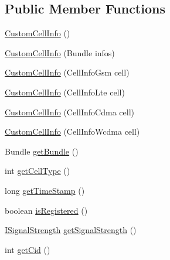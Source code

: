 \subsection*{Public Member Functions}
\begin{DoxyCompactItemize}
\item 
\hyperlink{classcom_1_1qualoutdoor_1_1recorder_1_1telephony_1_1CustomCellInfo_a0fa8dfdd8d509a0361c1286ea28907f6}{Custom\-Cell\-Info} ()
\item 
\hyperlink{classcom_1_1qualoutdoor_1_1recorder_1_1telephony_1_1CustomCellInfo_a43aa08090aedc7865df681a21146ac18}{Custom\-Cell\-Info} (Bundle infos)
\item 
\hyperlink{classcom_1_1qualoutdoor_1_1recorder_1_1telephony_1_1CustomCellInfo_a3603b4b5704ea4e03bc2d46071c57524}{Custom\-Cell\-Info} (Cell\-Info\-Gsm cell)
\item 
\hyperlink{classcom_1_1qualoutdoor_1_1recorder_1_1telephony_1_1CustomCellInfo_a5e4b002d86a4d579db2710555b57e833}{Custom\-Cell\-Info} (Cell\-Info\-Lte cell)
\item 
\hyperlink{classcom_1_1qualoutdoor_1_1recorder_1_1telephony_1_1CustomCellInfo_a7b6465c642331745f7b6e2706fd365fc}{Custom\-Cell\-Info} (Cell\-Info\-Cdma cell)
\item 
\hyperlink{classcom_1_1qualoutdoor_1_1recorder_1_1telephony_1_1CustomCellInfo_a97a065cf9b9a2c9886c4db7e79a61469}{Custom\-Cell\-Info} (Cell\-Info\-Wcdma cell)
\item 
Bundle \hyperlink{classcom_1_1qualoutdoor_1_1recorder_1_1telephony_1_1CustomCellInfo_a8c9db0839b7c4b08e37fc6e619660411}{get\-Bundle} ()
\item 
int \hyperlink{classcom_1_1qualoutdoor_1_1recorder_1_1telephony_1_1CustomCellInfo_a1d11b3897313e6f2f3a68820886752c0}{get\-Cell\-Type} ()
\item 
long \hyperlink{classcom_1_1qualoutdoor_1_1recorder_1_1telephony_1_1CustomCellInfo_aa1994d24bdd20e56e587aa7e2ac8f970}{get\-Time\-Stamp} ()
\item 
boolean \hyperlink{classcom_1_1qualoutdoor_1_1recorder_1_1telephony_1_1CustomCellInfo_aad17258b7352df3ce4e7d3bce90279ca}{is\-Registered} ()
\item 
\hyperlink{interfacecom_1_1qualoutdoor_1_1recorder_1_1telephony_1_1ISignalStrength}{I\-Signal\-Strength} \hyperlink{classcom_1_1qualoutdoor_1_1recorder_1_1telephony_1_1CustomCellInfo_a4d1f51ec74597facb936f02d07f05a38}{get\-Signal\-Strength} ()
\item 
int \hyperlink{classcom_1_1qualoutdoor_1_1recorder_1_1telephony_1_1CustomCellInfo_abaea62854f67e9964d86a8f71155f49e}{get\-Cid} ()

\end{DoxyCompactItemize}
